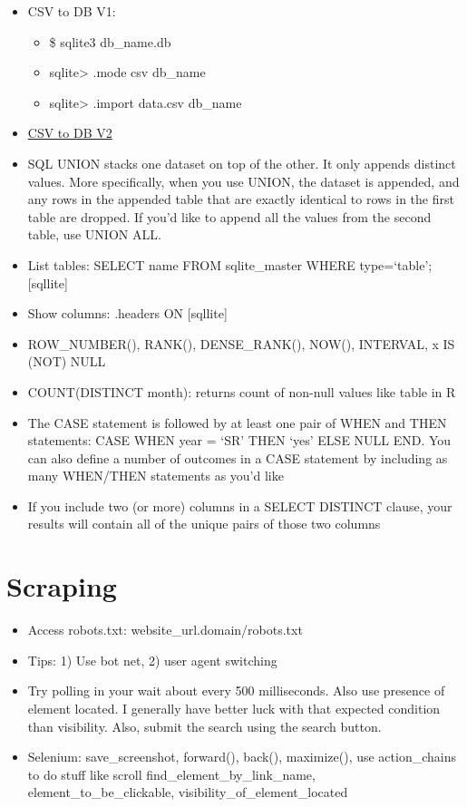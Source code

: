\documentclass[]{book}
\providecommand{\tightlist}{%
  \setlength{\itemsep}{0pt}\setlength{\parskip}{0pt}}
\theoremstyle{definition}
\theoremstyle{definition}
\theoremstyle{definition}
\theoremstyle{remark}
\begin{document}
\begin{itemize}
\item
  CSV to DB V1:

  \begin{itemize}
  \tightlist
  \item
    \$ sqlite3 db\_name.db
  \item
    sqlite\textgreater{} .mode csv db\_name
  \item
    sqlite\textgreater{} .import data.csv db\_name
  \end{itemize}
\item
  \href{https://gist.github.com/gfleetwood/c2ea91da4a8ab1a77f777e28e0b2949c}{CSV
  to DB V2}
\item
  SQL UNION stacks one dataset on top of the other. It only appends
  distinct values. More specifically, when you use UNION, the dataset is
  appended, and any rows in the appended table that are exactly
  identical to rows in the first table are dropped. If you'd like to
  append all the values from the second table, use UNION ALL.
\item
  List tables: SELECT name FROM sqlite\_master WHERE type=`table';
  {[}sqllite{]}
\item
  Show columns: .headers ON {[}sqllite{]}
\item
  ROW\_NUMBER(), RANK(), DENSE\_RANK(), NOW(), INTERVAL, x IS (NOT) NULL
\item
  COUNT(DISTINCT month): returns count of non-null values like table in
  R
\item
  The CASE statement is followed by at least one pair of WHEN and THEN
  statements: CASE WHEN year = `SR' THEN `yes' ELSE NULL END. You can
  also define a number of outcomes in a CASE statement by including as
  many WHEN/THEN statements as you'd like
\item
  If you include two (or more) columns in a SELECT DISTINCT clause, your
  results will contain all of the unique pairs of those two columns
\end{itemize}

\section{Scraping}\label{scraping}

\begin{itemize}
\item
  Access robots.txt: website\_url.domain/robots.txt
\item
  Tips: 1) Use bot net, 2) user agent switching
\item
  Try polling in your wait about every 500 milliseconds. Also use
  presence of element located. I generally have better luck with that
  expected condition than visibility. Also, submit the search using the
  search button.
\item
  Selenium: save\_screenshot, forward(), back(), maximize(), use
  action\_chains to do stuff like scroll find\_element\_by\_link\_name,
  element\_to\_be\_clickable, visibility\_of\_element\_located
\end{itemize}
\end{document}
